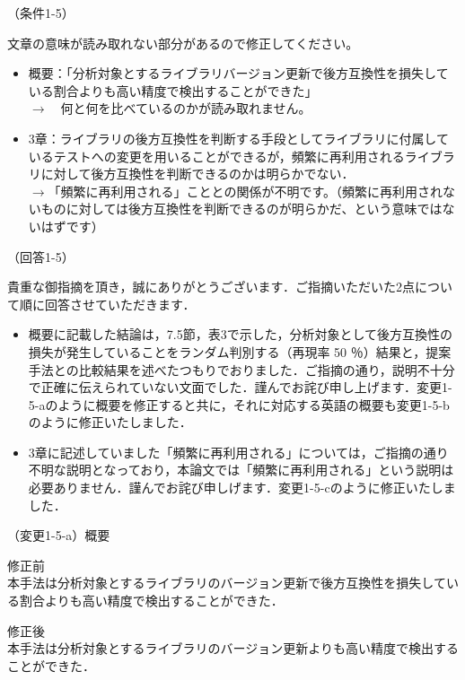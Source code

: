 \documentclass{jarticle} %
\def\subsection#1{ \vspace{1pc} {\gt #1} }
\begin{document}
\subsection{（条件1-5）}

文章の意味が読み取れない部分があるので修正してください。
\begin{itemize}
\item 概要：「分析対象とするライブラリバージョン更新で後方互換性を損失している割合よりも高い精度で検出することができた」\\
$\rightarrow$　何と何を比べているのかが読み取れません。
\item 3章：ライブラリの後方互換性を判断する手段としてライブラリに付属しているテストへの変更を用いることができるが，頻繁に再利用されるライブラリに対して後方互換性を判断できるのかは明らかでない．\\
$\rightarrow$「頻繁に再利用される」こととの関係が不明です。（頻繁に再利用されないものに対しては後方互換性を判断できるのが明らかだ、という意味ではないはずです）
\end{itemize}

\subsection{（回答1-5）}

貴重な御指摘を頂き，誠にありがとうございます．ご指摘いただいた2点について順に回答させていただきます．
\begin{itemize}
\item 概要に記載した結論は，7.5節，表3で示した，分析対象として後方互換性の損失が発生していることをランダム判別する（再現率 50 ％）結果と，提案手法との比較結果を述べたつもりでおりました．ご指摘の通り，説明不十分で正確に伝えられていない文面でした．謹んでお詫び申し上げます．変更1-5-aのように概要を修正すると共に，それに対応する英語の概要も変更1-5-bのように修正いたしました．
\item 3章に記述していました「頻繁に再利用される」については，ご指摘の通り不明な説明となっており，本論文では「頻繁に再利用される」という説明は必要ありません．謹んでお詫び申しげます．変更1-5-cのように修正いたしました．
\end{itemize}



\subsection{（変更1-5-a）概要}
\vspace{-0.3cm}
\begin{description}
\item 修正前\\
\phantom{　}
本手法は分析対象とするライブラリのバージョン更新で後方互換性を損失している割合よりも高い精度で検出することができた．
\vspace{-0.3cm}
\item 修正後\\
\phantom{　}
本手法は分析対象とするライブラリのバージョン更新\textcolor{red}{}よりも高い精度で検出することができた．
\end{description}
\end{document}
